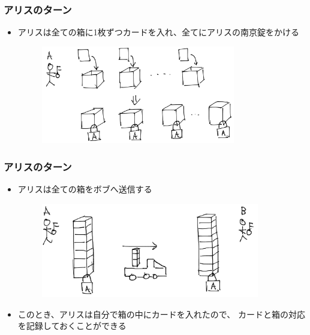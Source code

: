 \begin{frame}
  \frametitle{\showAndIncrement アリスのターン}

  \begin{itemize}
    \item アリスは全ての箱に1枚ずつカードを入れ、全てにアリスの南京錠をかける
    \begin{figure}[h]
      \includegraphics[width=0.8\textwidth]{img/make_deck.png}
    \end{figure}
  \end{itemize}
\end{frame}

\begin{frame}
  \frametitle{\showIndex アリスのターン}

  \begin{itemize}
    \item<+-> アリスは全ての箱をボブへ送信する
    \begin{figure}[h]
      \includegraphics[width=0.9\textwidth]{img/send_to_b.png}
    \end{figure}

    \item<+-> このとき、アリスは自分で箱の中にカードを入れたので、
    カードと箱の対応を記録しておくことができる
  \end{itemize}
\end{frame}


